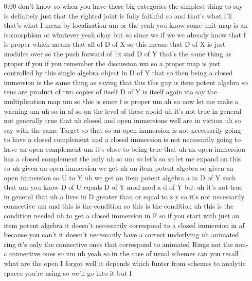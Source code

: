 \begin{unfinished}{0:00}
don't  know  so  when  you  have  these  big
categories  the  simplest  thing  to  say  is
definitely  just  that  the  righted  joint
is  fully  faithful  so  and  that's  what
I'll  that's  what  I  mean  by
localization  um  or  the  yeah  you  know
some  unit  map  is  an  isomorphism  or
whatever  yeah  okay  but  so  since  we  if  we
we  already  know  that  f  is  proper  which
means  that  all  of  D  of  X  so  this  means
that  D  of
X  is  just  modules  over  so  the  push
forward  of  1x  and  D  of  Y  that's  the  same
thing  as  proper  if  you  if  you  remember
the
discussion  um  so  a  proper  map  is  just
controlled  by  this  single  algebra  object
in  D  of  Y  that  so  then  being  a  closed
immersion  is  the  same  thing  as  saying
that  this  this  guy  is  item
potent
algebra  so  tens  are  product  of  two
copies  of  itself  D  of  Y  is  itself  again
via  say  the  multiplication
map
um  so  this  is  since  f  is
proper
um  ah  so  now  let  me  make  a
warning
um  uh
so  in  af  so  on  the  level  of  these
apoid  uh  it's  not  true  in  general  not
generally
true  that  uh
closed  and  open
immersions
well  are  in
viction  uh  so  say  with  the  same
Target
so  that  so  an  open  immersion  is  not
necessarily  going  to  have  a  closed
complement  and  a  closed  immersion  is  not
necessarily  going  to  have  an  open
complement
um  it's  close  to  being  true  that  uh  an
open  immersion  has  a  closed  complement
the  only  uh
so  um  so  let's  so  so  let  me  expand  on
this  so  uh  given  an  open
immersion
we  get  uh  an  item  potent
algebra  so  given  an  open  immersion  so  U
to  Y  uh  we  get  an  item  potent  algebra  a
in  D  of  Y  such  that  um  you  know  D  of  U
equals  D  of  Y  mod  mod  a  d  of
Y
but  uh  it's  not  true  in
general
that  uh  a  lives  in  D  greater  than  or
equal  to  z  y  so  it's  not  necessarily
connective  um  and  this  is  the  condition
so  this  is  the  condition  uh  this  is  the
condition  needed  uh  to  get  a  closed
immersion  in
F  so  if  you  start  with  just  an  item
potent  algebra  it  doesn't  necessarily
correspond  to  a  closed  immersion  in
af  because  you  can't  it  doesn't
necessarily  have  a  correct  underlying
uh  animated  ring  it's  only  the
connective  ones  that  correspond  to
animated  Rings  not  the  non-c  connective
ones  so
um
uh  yeah  so  in  the  case  of  usual  schemes
can  you  recall  what  are  the
open  I  forgot  well  it  depends  which
funter  from  schemes  to  analytic  spaces
you're  using  so  we'll  go  into  it  but  I

\end{unfinished}
